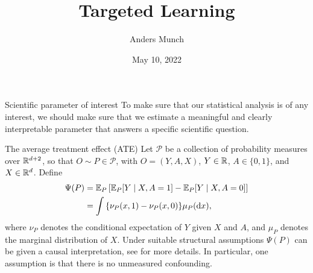 \documentclass[smaller]{beamer}\usepackage{listings}
\author{Anders Munch}
\date{May 10, 2022}
\title{Targeted Learning}
\begin{document}
\maketitle
\begin{frame}[label={sec:org060811e}]{Scientific parameter of interest}
\small To make sure that our statistical analysis is of any interest, we should make sure that we
estimate a meaningful and clearly interpretable parameter that answers a specific scientific
question.
\begin{exampleblock}{The average treatment effect (ATE)}
Let $\mathcal{P}$ be a collection of probability measures over $\mathbb{R}^{d+2}$, so that
$O \sim P \in \mathcal{P}$, with $O = (Y, A, X)$, $Y\in \mathbb{R}$, $A\in \{0,1\}$, and $X \in
\mathbb{R}^d$. Define
\begin{align*}
  \Psi(P)
  & = \operatorname{\mathbb{E}}_P{\left[ \operatorname{\mathbb{E}}_P[Y \mid X, A=1] - \operatorname{\mathbb{E}}_P[Y \mid X, A=0] \right]} \\
  & = \int {\left\{ \nu_P(x, 1) - \nu_P(x, 0) \right\}} \mu_P(\mathop{}\!\mathrm{d} x),
\end{align*}
where $\nu_P$ denotes the conditional expectation of $Y$ given $X$ and $A$, and $\mu_P$ denotes the
marginal distribution of $X$. 
Under suitable structural assumptions \(\Psi(P)\) can be given a causal interpretation, see
\citep{kennedy2016semiparametric,hernanRobinsWhatIf} for more details. In particular, one
assumption is that there is no unmeasured confounding.
\end{exampleblock}
\end{frame}
\end{document}
